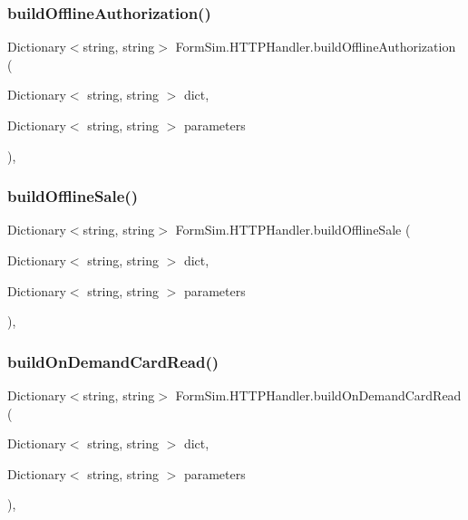 \subsubsection{\texorpdfstring{build\+Offline\+Authorization()}{buildOfflineAuthorization()}}
{\footnotesize\ttfamily Dictionary$<$string, string$>$ Form\+Sim.\+H\+T\+T\+P\+Handler.\+build\+Offline\+Authorization (\begin{DoxyParamCaption}\item[{Dictionary$<$ string, string $>$}]{dict,  }\item[{Dictionary$<$ string, string $>$}]{parameters }\end{DoxyParamCaption})\hspace{0.3cm}{\ttfamily [inline]}, {\ttfamily [private]}}

\mbox{\label{class_form_sim_1_1_h_t_t_p_handler_a8655b924790704629c9c746baf03b8c7}} 
\subsubsection{\texorpdfstring{build\+Offline\+Sale()}{buildOfflineSale()}}
{\footnotesize\ttfamily Dictionary$<$string, string$>$ Form\+Sim.\+H\+T\+T\+P\+Handler.\+build\+Offline\+Sale (\begin{DoxyParamCaption}\item[{Dictionary$<$ string, string $>$}]{dict,  }\item[{Dictionary$<$ string, string $>$}]{parameters }\end{DoxyParamCaption})\hspace{0.3cm}{\ttfamily [inline]}, {\ttfamily [private]}}

\mbox{\label{class_form_sim_1_1_h_t_t_p_handler_a13ec56dae880175a2819b233a784fa58}} 
\subsubsection{\texorpdfstring{build\+On\+Demand\+Card\+Read()}{buildOnDemandCardRead()}}
{\footnotesize\ttfamily Dictionary$<$string, string$>$ Form\+Sim.\+H\+T\+T\+P\+Handler.\+build\+On\+Demand\+Card\+Read (\begin{DoxyParamCaption}\item[{Dictionary$<$ string, string $>$}]{dict,  }\item[{Dictionary$<$ string, string $>$}]{parameters }\end{DoxyParamCaption})\hspace{0.3cm}{\ttfamily [inline]}, {\ttfamily [private]}}


